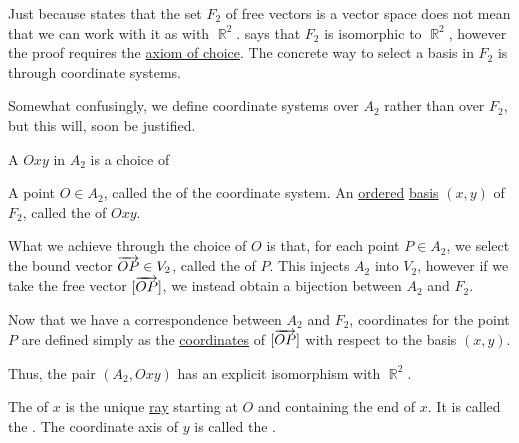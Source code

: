 \begin{definition}\label{def:euclidean_plane_coordinate_system}
  Just because  states that the set \( F_2 \) of free vectors is a vector space does not mean that we can work with it as with \( \BbbR^2 \).  says that \( F_2 \) is isomorphic to \( \BbbR^2 \), however the proof requires the \hyperref[def:zfc/choice]{axiom of choice}. The concrete way to select a basis in \( F_2 \) is through coordinate systems.

  Somewhat confusingly, we define coordinate systems over \( A_2 \) rather than over \( F_2 \), but this will, soon be justified.

  A  \( Oxy \) in \( A_2 \) is a choice of
  \begin{thmenum}
     A point \( O \in A_2 \), called the  of the coordinate system.
     An \hyperref[def:partially_ordered_set]{ordered} \hyperref[def:hamel_basis]{basis} \( (x, y) \) of \( F_2 \), called the  of \( Oxy \).
  \end{thmenum}

  What we achieve through the choice of \( O \) is that, for each point \( P \in A_2 \), we select the bound vector \( \overrightarrow{OP} \in V_2 \), called the  of \( P \). This injects \( A_2 \) into \( V_2 \), however if we take the free vector \( [\overrightarrow{OP}] \), we instead obtain a bijection between \( A_2 \) and \( F_2 \).

  Now that we have a correspondence between \( A_2 \) and \( F_2 \), coordinates for the point \( P \) are defined simply as the \hyperref[def:basis_decomposition]{coordinates} of \( [\overrightarrow{OP}] \) with respect to the basis \( (x, y) \).

  Thus, the pair \( (A_2, Oxy) \) has an explicit isomorphism with \( \BbbR^2 \).

  The  of \( x \) is the unique \hyperref[def:affine_plane/ray]{ray} starting at \( O \) and containing the end of \( x \). It is called the . The coordinate axis of \( y \) is called the .
\end{definition}

